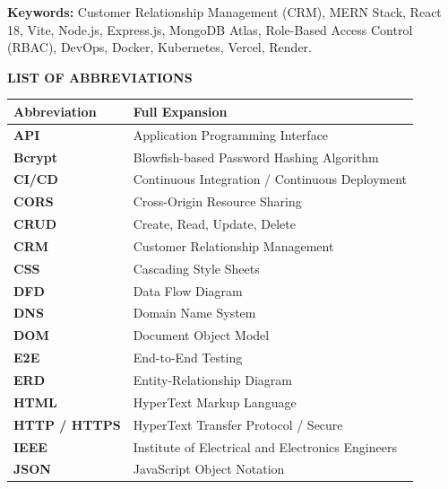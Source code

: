 \vspace{0.6cm}
\noindent \textbf{Keywords:} Customer Relationship Management (CRM), MERN Stack, React 18, Vite, Node.js, Express.js, MongoDB Atlas, Role-Based Access Control (RBAC), DevOps, Docker, Kubernetes, Vercel, Render.

\newpage
\thispagestyle{plain}
\begin{center}
    {\fontsize{16}{20}\selectfont \textbf{LIST OF ABBREVIATIONS}}\\[0.6cm]
\end{center}

\begin{table}[h!]
\centering
\renewcommand{\arraystretch}{1.25}
\begin{tabular}{|p{3cm}|p{11.5cm}|}
\hline
\textbf{Abbreviation} & \textbf{Full Expansion} \\ \hline
\textbf{API} & Application Programming Interface \\ \hline
\textbf{Bcrypt} & Blowfish-based Password Hashing Algorithm \\ \hline
\textbf{CI/CD} & Continuous Integration / Continuous Deployment \\ \hline
\textbf{CORS} & Cross-Origin Resource Sharing \\ \hline
\textbf{CRUD} & Create, Read, Update, Delete \\ \hline
\textbf{CRM} & Customer Relationship Management \\ \hline
\textbf{CSS} & Cascading Style Sheets \\ \hline
\textbf{DFD} & Data Flow Diagram \\ \hline
\textbf{DNS} & Domain Name System \\ \hline
\textbf{DOM} & Document Object Model \\ \hline
\textbf{E2E} & End-to-End Testing \\ \hline
\textbf{ERD} & Entity-Relationship Diagram \\ \hline
\textbf{HTML} & HyperText Markup Language \\ \hline
\textbf{HTTP / HTTPS} & HyperText Transfer Protocol / Secure \\ \hline
\textbf{IEEE} & Institute of Electrical and Electronics Engineers \\ \hline
\textbf{JSON} & JavaScript Object Notation \\ \hline

\end{tabular}
\end{table}
